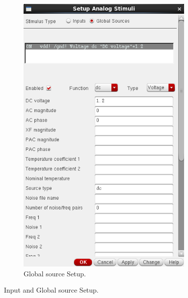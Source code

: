 \documentclass[11pt]{article}
\begin{document}
\begin{figure}[!h]
\begin{subfigure}[h]{0.5\textwidth}
        \includegraphics[width=0.95\textwidth,height=0.45\textheight]{global.png}
        \caption{Global source Setup.}
    \end{subfigure}
    \caption{Input and Global source Setup.}
\end{figure}
\newpage
\end{document}

